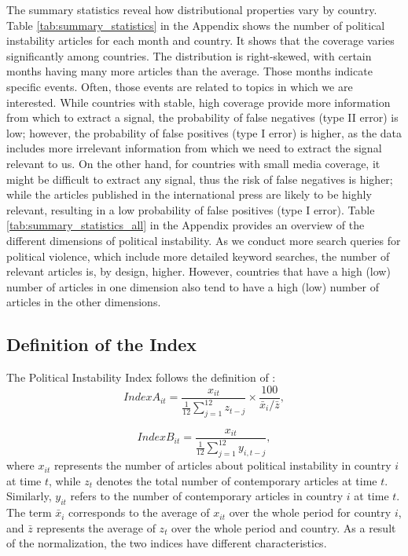 \documentclass[12pt,a4paper,fleqn]{article}
\begin{document}
The summary statistics reveal how distributional properties vary by country. Table \ref{tab:summary_statistics} in the Appendix shows the number of political instability articles for each month and country. It shows that the coverage varies significantly among countries. The distribution is right-skewed, with certain months having many more articles than the average. Those months indicate specific events. Often, those events are related to topics in which we are interested. While countries with stable, high coverage provide more information from which to extract a signal, the probability of false negatives (type II error) is low; however, the probability of false positives (type I error) is higher, as the data includes more irrelevant information from which we need to extract the signal relevant to us. On the other hand, for countries with small media coverage, it might be difficult to extract any signal, thus the risk of false negatives is higher; while the articles published in the international press are likely to be highly relevant, resulting in a low probability of false positives (type I error).  Table \ref{tab:summary_statistics_all} in the Appendix provides an overview of the different dimensions of political instability. As we conduct more search queries for political violence, which include more detailed keyword searches, the number of relevant articles is, by design, higher. However, countries that have a high (low) number of articles in one dimension also tend to have a high (low) number of articles in the other dimensions.



\subsection{Definition of the Index}\label{sec:index}

The Political Instability Index follows the definition of \cite{BARRETT2022}:
\begin{equation}
    IndexA_{it} = \frac{x_{it}}{\frac{1}{12} \sum_{j=1}^{12} z_{t-j}} \times \frac{100}{\bar{x}_i/\bar{z}},
\end{equation}
\vspace{-7em}

\begin{equation}
    IndexB_{it} = \frac{x_{it}}{\frac{1}{12} \sum_{j=1}^{12} y_{i,t-j}},
\end{equation}
where $x_{it}$ represents the number of articles about political instability in country $i$ at time $t$, while $z_t$ denotes the total number of contemporary articles at time $t$. Similarly, $y_{it}$ refers to the number of contemporary articles in country $i$ at time $t$. The term $\bar{x}_i$ corresponds to the average of $x_{it}$ over the whole period for country $i$, and $\bar{z}$ represents the average of $z_t$ over the whole period and country. As a result of the normalization, the two indices have different characteristics. 
\end{document}
